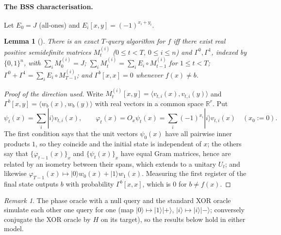 \documentclass[11pt]{article}
\newtheorem{lemma}[theorem]{Lemma}
\theoremstyle{remark}
\newtheorem{remark}[theorem]{Remark}
\begin{document}
\paragraph{The BSS characterisation.} Let $E_0=J$ (all-ones) and $E_i[x,y]=(-1)^{x_i+y_i}$.
\begin{lemma}[\cite{BSS}]\label{lem:bss}
There is an exact $T$-query algorithm for $f$ iff there exist real positive semidefinite matrices
$M_t^{(i)}$ ($0\le t<T$, $0\le i\le n$) and $\Gamma^0,\Gamma^1$, indexed by $\{0,1\}^n$, with
$\sum_i M_0^{(i)}=J$; $\sum_i M_t^{(i)}=\sum_i E_i\circ M_{t-1}^{(i)}$ for $1\le t<T$;
$\Gamma^0+\Gamma^1=\sum_iE_i\circ M_{T-1}^{(i)}$; and $\Gamma^b[x,x]=0$ whenever $f(x)\ne b$.
\end{lemma}
\begin{proof}[Proof of the direction used]
Write $M_t^{(i)}[x,y]=\langle v_{t,i}(x),v_{t,i}(y)\rangle$ and $\Gamma^b[x,y]=\langle w_b(x),w_b(y)\rangle$
with real vectors in a common space $\mathbb R^r$. Put
\[\psi_t(x)=\sum_i|i\rangle v_{t,i}(x),\qquad \varphi_t(x)=O_x\psi_t(x)=\sum_i(-1)^{x_i}|i\rangle v_{t,i}(x)\quad(x_0:=0).\]
The first condition says that the unit vectors $\psi_0(x)$ have all pairwise inner products $1$,
so they coincide and the initial state is independent of $x$; the others say that $\{\varphi_{t-1}(x)\}_x$ and
$\{\psi_t(x)\}_x$ have equal Gram matrices, hence are related by an isometry between their spans, which
extends to a unitary $U_t$; and likewise $\varphi_{T-1}(x)\mapsto|0\rangle w_0(x)+|1\rangle w_1(x)$.
Measuring the first register of the final state outputs $b$ with probability $\Gamma^b[x,x]$, which is
$0$ for $b\ne f(x)$.
\end{proof}

\begin{remark}
The phase oracle with a null query and the standard XOR oracle simulate each other one query for one
(map $|0\rangle\mapsto|1\rangle|+\rangle$, $|i\rangle\mapsto|i\rangle|-\rangle$; conversely conjugate the XOR
oracle by $H$ on its target), so the results below hold in either model.
\end{remark}
\end{document}
